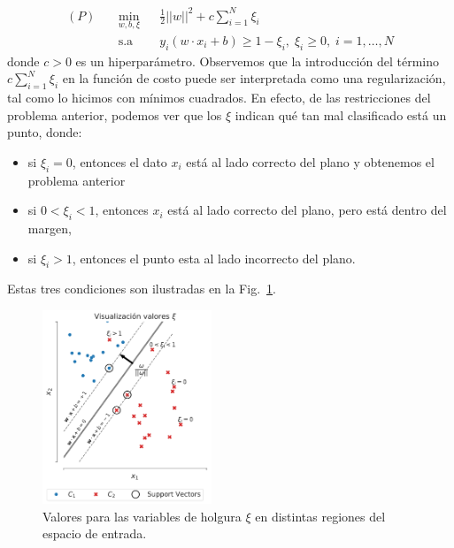 \begin{equation}
\begin{aligned}
(P)\quad & \underset{w,b, \xi}{\text{min}}
& & \frac{1}{2}||w||^2 + c\sum\limits_{i=1}^{N} \xi_i \\
& \text{s.a}
& & y_i (w\cdot x_i +b) \geq 1 - \xi_i,\;\xi_i\geq0,\; i = 1, \ldots, N
\end{aligned}
\end{equation}
donde $c>0$ es un hiperparámetro. Observemos que la introducción del término $c\sum_{i=1}^{N} \xi_i$ en la función de costo puede ser interpretada como una regularización, tal como lo hicimos con mínimos cuadrados. En efecto, de las restricciones del problema anterior, podemos ver que los $\xi$ indican qué tan mal clasificado está un punto, donde: 
\begin{itemize}
    \item si $\xi_i = 0$, entonces el dato $x_i$ está al lado correcto del plano y obtenemos el problema anterior
    \item si $0<\xi_i <1$, entonces $x_i$ está al lado correcto del plano, pero está dentro del margen, 
    \item si $\xi_i>1$, entonces el punto esta al lado incorrecto del plano.
\end{itemize}
Estas tres condiciones son ilustradas en la Fig.~\ref{fig:soft_margin}.
\begin{figure}[ht]
    \centering
    \includegraphics[width=0.45\textwidth]{img/cap5_max_margen3}
    \caption{Valores para las variables de holgura $\xi$ en distintas regiones del espacio de entrada.}
    \label{fig:soft_margin}
\end{figure}

